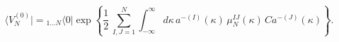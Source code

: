 \begin{equation}
\langle V_N^{(0)}|={}_{1\dots N}\langle 0|\exp\left\{
\frac{1}{2}\,\sum_{I,J=1}^{N}\int_{-\infty}^{\infty}
d\kappa\,a^{-(I)}(\kappa)\,\mu^{IJ}_{N}(\kappa)\,Ca^{-(J)}(\kappa)
\right\}.
\end{equation}

